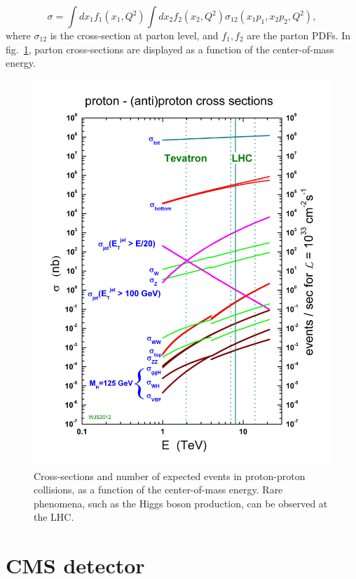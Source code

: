 \begin{equation}
\sigma = \int dx_1 f_1(x_1,Q^2) \int dx_2 f_2(x_2,Q^2) \sigma_{12}(x_1 p_1, x_2 p_2, Q^2),
\end{equation}
where $\sigma_{12}$ is the cross-section at parton level, and $f_1,f_2$ are the parton PDFs. In fig.~\ref{fig:LHC_pp_cross_section}, parton cross-sections are displayed as a function of the center-of-mass energy.

\begin{figure}[!htb]
  \centering
    \includegraphics[width=.5\textwidth]{figures/crosssections2013.jpg}
  \caption{Cross-sections and number of expected events in proton-proton collisions, as a function of the center-of-mass energy. Rare phenomena, such as the Higgs boson production, can be observed at the LHC.}
  \label{fig:LHC_pp_cross_section}
\end{figure}

\section{CMS detector}

